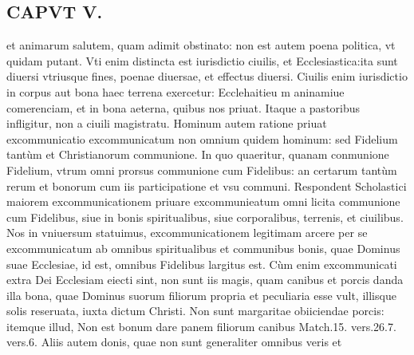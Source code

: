 \documentclass{article}
\begin{document}
\begin{pages}
\section*{CAPVT  V. }
\marginpar{[ p.401 ]}\pstart et animarum salutem, quam adimit obstinato: non est autem poena politica, vt quidam putant. Vti enim distincta est iurisdictio ciuilis, et Ecclesiastica:ita sunt diuersi vtriusque fines, poenae diuersae, et effectus diuersi. Ciuilis enim iurisdictio in corpus aut bona haec terrena exercetur: Ecclehaitieu m aninamiue comerenciam, et in bona aeterna, quibus nos priuat. Itaque a pastoribus infligitur, non a ciuili magistratu.  \pend\pstart Hominum autem ratione priuat excommunicatio excommunicatum non omnium quidem hominum: sed Fidelium tantùm et Christianorum communione. In quo quaeritur, quanam conmunione Fidelium, vtrum omni prorsus communione cum Fidelibus: an certarum tantùm rerum et bonorum cum iis participatione et vsu communi. Respondent Scholastici maiorem excommunicationem priuare excommunieatum omni licita communione cum Fidelibus, siue in bonis spiritualibus, siue corporalibus, terrenis, et ciuilibus. Nos in vniuersum statuimus, excommunicationem legitimam arcere per se excommunicatum ab omnibus spiritualibus et communibus bonis, quae Dominus suae Ecclesiae, id est, omnibus Fidelibus largitus est. Cùm enim excommunicati extra Dei Ecclesiam eiecti sint, non sunt iis magis, quam canibus et porcis danda illa bona, quae Dominus suorum filiorum propria et peculiaria esse vult, illisque solis reseruata, iuxta dictum Christi. Non sunt margaritae obiiciendae porcis: itemque illud, Non est bonum dare panem filiorum canibus Match.15. vers.26.7. vers.6. Aliis autem donis, quae non sunt generaliter omnibus veris et  \pend

\end{pages}
\end{document}
